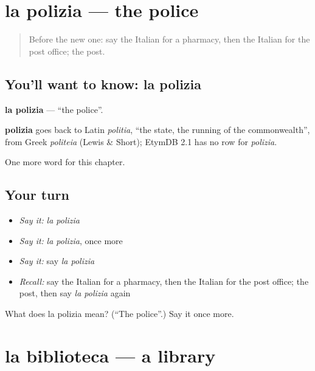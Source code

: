 \section[la polizia]{la polizia — the police}

\label{lesson:IT-C84-polizia}



\begin{quote}
Before the new one: say the Italian for a pharmacy, then the Italian for the post office; the post.
\end{quote}

\subsection*{You'll want to know: la polizia}
\textbf{la polizia} — \textquotedblleft{}the police\textquotedblright{}.

\begin{cousinweb}
\textbf{polizia} goes back to Latin \emph{politia}, \textquotedblleft{}the state, the running of the commonwealth\textquotedblright{}, from Greek \emph{politeia} (Lewis \& Short); EtymDB 2.1 has no row for \emph{polizia}.
\end{cousinweb}

\begin{grammarlens}[title={What you've built}]
One more word for this chapter.
\end{grammarlens}

\subsection*{Your turn}
\begin{itemize}
\raggedright
  \item \emph{Say it:} \emph{la polizia}
  \item \emph{Say it:} \emph{la polizia}, once more
  \item \emph{Say it:} say \emph{la polizia}
  \item \emph{Recall:} say the Italian for a pharmacy, then the Italian for the post office; the post, then say \emph{la polizia} again
\end{itemize}

\begin{tcolorbox}[breakable,colback=teal!4,colframe=teal!35!black,title={Before you move on}]
What does la polizia mean? (\textquotedblleft{}The police\textquotedblright{}.) Say it once more.
\end{tcolorbox}
\section[la biblioteca]{la biblioteca — a library}

